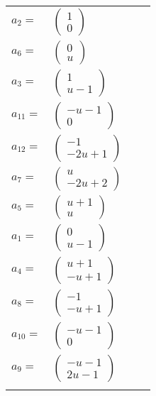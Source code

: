 \documentclass[1p]{elsarticle_modified}
\theoremstyle{definition}
\begin{document}
\begin{tabular}{m{7pt} m{180pt} m{7pt} m{180pt} }
\flushright $a_{2}=$&$\begin{pmatrix}1\\0\end{pmatrix}$ \\
\flushright $a_{6}=$&$\begin{pmatrix}0\\u\end{pmatrix}$ \\
\flushright $a_{3}=$&$\begin{pmatrix}1\\u-1\end{pmatrix}$ \\
\flushright $a_{11}=$&$\begin{pmatrix}- u-1\\0\end{pmatrix}$ \\
\flushright $a_{12}=$&$\begin{pmatrix}-1\\-2 u+1\end{pmatrix}$ \\
\flushright $a_{7}=$&$\begin{pmatrix}u\\-2 u+2\end{pmatrix}$ \\
\flushright $a_{5}=$&$\begin{pmatrix}u+1\\u\end{pmatrix}$ \\
\flushright $a_{1}=$&$\begin{pmatrix}0\\u-1\end{pmatrix}$ \\
\flushright $a_{4}=$&$\begin{pmatrix}u+1\\- u+1\end{pmatrix}$ \\
\flushright $a_{8}=$&$\begin{pmatrix}-1\\- u+1\end{pmatrix}$ \\
\flushright $a_{10}=$&$\begin{pmatrix}- u-1\\0\end{pmatrix}$ \\
\flushright $a_{9}=$&$\begin{pmatrix}- u-1\\2 u-1\end{pmatrix}$\\&\end{tabular}
\end{document}
